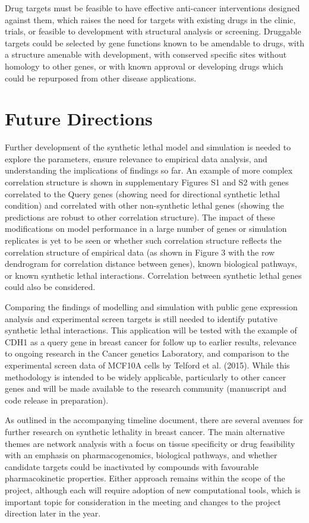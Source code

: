 Drug targets must be feasible to have effective anti-cancer interventions designed against them, which raises the need for targets with existing drugs in the clinic, trials, or feasible to development with structural analysis or screening.  Druggable targets could be selected by gene functions known to be amendable to drugs, with a structure amenable with development, with conserved specific sites without homology to other genes, or with known approval or developing drugs which could be repurposed from other disease applications.

\section{Future Directions}

Further development of the synthetic lethal model and simulation is needed to explore the parameters, ensure relevance to empirical data analysis, and understanding the implications of findings so far.  An example of more complex correlation structure is shown in supplementary Figures S1 and S2 with genes correlated to the Query genes (showing need for directional synthetic lethal condition) and correlated with other non-synthetic lethal genes (showing the predictions are robust to other correlation structure).  The impact of these modifications on model performance in a large number of genes or simulation replicates is yet to be seen or whether such correlation structure reflects the correlation structure of empirical data (as shown in Figure 3 with the row dendrogram for correlation distance between genes), known biological pathways, or known synthetic lethal interactions. Correlation between synthetic lethal genes could also be considered.

Comparing the findings of modelling and simulation with public gene expression analysis and experimental screen targets is still needed to identify putative synthetic lethal interactions.  This application will be tested with the example of CDH1 as a query gene in breast cancer for follow up to earlier results, relevance to ongoing research in the Cancer genetics Laboratory, and comparison to the experimental screen data of MCF10A cells by Telford et al. (2015).  While this methodology is intended to be widely applicable, particularly to other cancer genes and will be made available to the research community (manuscript and code release in preparation).

As outlined in the accompanying timeline document, there are several avenues for further research on synthetic lethality in breast cancer. The main alternative themes are network analysis with a focus on tissue specificity or drug feasibility with an emphasis on pharmacogenomics, biological pathways, and whether candidate targets could be inactivated by compounds with favourable pharmacokinetic properties. Either approach remains within the scope of the project, although each will require adoption of new computational tools, which is important topic for consideration in the meeting and changes to the project direction later in the year.

